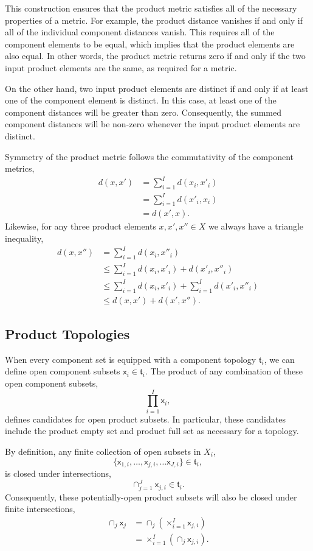 \documentclass[
  letterpaper,
  DIV=11,
  numbers=noendperiod]{scrartcl}
\begin{document}
This construction ensures that the product metric satisfies all of the
necessary properties of a metric. For example, the product distance
vanishes if and only if all of the individual component distances
vanish. This requires all of the component elements to be equal, which
implies that the product elements are also equal. In other words, the
product metric returns zero if and only if the two input product
elements are the same, as required for a metric.

On the other hand, two input product elements are distinct if and only
if at least one of the component element is distinct. In this case, at
least one of the component distances will be greater than zero.
Consequently, the summed component distances will be non-zero whenever
the input product elements are distinct.

Symmetry of the product metric follows the commutativity of the
component metrics, \begin{align*}
d(x, x')
&= \sum_{i = 1}^{I} d(x_{i}, x'_{i})
\\
&= \sum_{i = 1}^{I} d(x'_{i}, x_{i})
\\
&= d(x', x).
\end{align*} Likewise, for any three product elements
\(x, x', x'' \in X\) we always have a triangle inequality,
\begin{align*}
d(x, x'')
&=
\sum_{i = 1}^{I} d(x_{i}, x''_{i})
\\
&\le
\sum_{i = 1}^{I} d(x_{i}, x'_{i}) + d(x'_{i}, x''_{i})
\\
&\le
\sum_{i = 1}^{I} d(x_{i}, x'_{i}) + \sum_{i = 1}^{I} d(x'_{i}, x''_{i})
\\
&\le
d(x, x') + d(x', x'').
\end{align*}

\subsection{Product Topologies}\label{sec:topology}

When every component set is equipped with a component topology
\(\mathfrak{t}_{i}\), we can define open component subsets
\(\mathsf{x}_{i} \in \mathfrak{t}_{i}\). The product of any combination
of these open component subsets, \[
\prod_{i = 1}^{I} \mathsf{x}_{i},
\] defines candidates for open product subsets. In particular, these
candidates include the product empty set and product full set as
necessary for a topology.

By definition, any finite collection of open subsets in \(X_{i}\), \[
\{ \mathsf{x}_{1, i}, \ldots,
   \mathsf{x}_{j, i}, \ldots
   \mathsf{x}_{J, i} \} \in \mathfrak{t}_{i},
\] is closed under intersections, \[
\cap_{j = 1}^{J} \mathsf{x}_{j, i} \in \mathfrak{t}_{i}.
\] Consequently, these potentially-open product subsets will also be
closed under finite intersections, \begin{align*}
\cap_{j} \mathsf{x}_{j}
&=
\cap_{j} \left( \times_{i = 1}^{I} \mathsf{x}_{j, i} \right)
\\
&=
\times_{i = 1}^{I} \left( \cap_{j} \mathsf{x}_{j, i} \right).
\end{align*}
\end{document}

